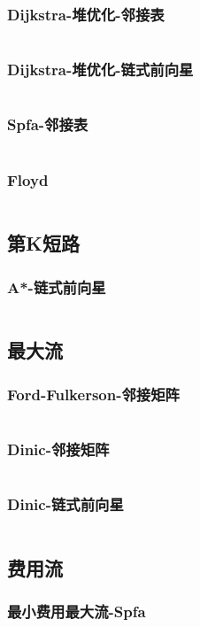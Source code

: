 \documentclass[a4paper,11pt]{article}
\begin{document}
\subsubsection{Dijkstra-堆优化-邻接表}
\inputminted[breaklines]{c++}{图论/Dijkstra-邻接表-堆优化.cpp}
\subsubsection{Dijkstra-堆优化-链式前向星}
\inputminted[breaklines]{c++}{图论/Dijkstra-链式前向星-堆优化.cpp}
\subsubsection{Spfa-邻接表}
\inputminted[breaklines]{c++}{图论/SPFA-邻接表.cpp}
\subsubsection{Floyd}
\inputminted[breaklines]{c++}{图论/Floyd.cpp}
\subsection{第K短路}
\subsubsection{A*-链式前向星}
\inputminted[breaklines]{c++}{图论/AStar.cpp}
\subsection{最大流}
\subsubsection{Ford-Fulkerson-邻接矩阵}
\inputminted[breaklines]{c++}{图论/Ford-Fulkerson-邻接矩阵.cpp}
\subsubsection{Dinic-邻接矩阵}
\inputminted[breaklines]{c++}{图论/Dinic-邻接矩阵.cpp}
\subsubsection{Dinic-链式前向星}
\inputminted[breaklines]{c++}{图论/Dinic-链式前向星.cpp}
\subsection{费用流}
\subsubsection{最小费用最大流-Spfa}
\inputminted[breaklines]{c++}{图论/最小费用最大流-SPFA.cpp}
\end{document}

